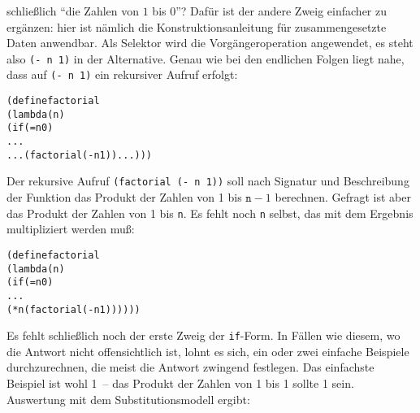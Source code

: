 schließlich "`die Zahlen von $1$ bis $0$"'?  Dafür ist der andere Zweig
einfacher zu ergänzen: hier ist nämlich die Konstruktionsanleitung für
zusammengesetzte Daten anwendbar.  Als Selektor wird die
Vorgängeroperation angewendet, es steht also \texttt{(- n 1)} in der
Alternative.
Genau wie bei den endlichen Folgen liegt nahe, dass auf \texttt{(- n 1)} ein
rekursiver Aufruf erfolgt:
%
\begin{alltt}
(define factorial
  (lambda (n)
    (if (= n 0)
        ...
        ... (factorial (- n 1)) ...)))
\end{alltt}
%
Der rekursive Aufruf \texttt{(factorial (- n 1))} soll nach
Signatur und Beschreibung der Funktion das Produkt der Zahlen von 1 bis
$\texttt{n}-1$ berechnen.  Gefragt ist aber das Produkt der Zahlen von
1 bis \texttt{n}.  Es fehlt noch \texttt{n} selbst, das mit dem
Ergebnis multipliziert werden muß:
%
\begin{alltt}
(define factorial
  (lambda (n)
    (if (= n 0)
        ...
        (* n (factorial (- n 1))))))
\end{alltt}
%
Es fehlt schließlich noch der erste Zweig der \texttt{if}-Form.  In
Fällen wie diesem, wo die Antwort nicht offensichtlich ist,
lohnt es sich, ein oder zwei einfache Beispiele durchzurechnen, die meist die
Antwort zwingend festlegen.  Das einfachste Beispiel ist wohl 1~--
das Produkt der Zahlen von 1 bis 1 sollte 1 sein.  Auswertung mit dem
Substitutionsmodell ergibt:

